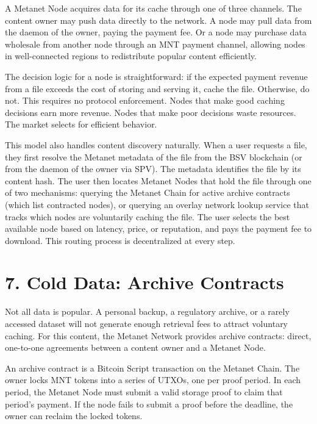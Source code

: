 \documentclass[11pt,a4paper]{article}
\begin{document}
A Metanet Node acquires data for its cache through one of three channels. The content owner may push data directly to the network. A node may pull data from the daemon of the owner, paying the payment fee. Or a node may purchase data wholesale from another node through an MNT payment channel, allowing nodes in well-connected regions to redistribute popular content efficiently.

The decision logic for a node is straightforward: if the expected payment revenue from a file exceeds the cost of storing and serving it, cache the file. Otherwise, do not. This requires no protocol enforcement. Nodes that make good caching decisions earn more revenue. Nodes that make poor decisions waste resources. The market selects for efficient behavior.

This model also handles content discovery naturally. When a user requests a file, they first resolve the Metanet metadata of the file from the BSV blockchain (or from the daemon of the owner via SPV). The metadata identifies the file by its content hash. The user then locates Metanet Nodes that hold the file through one of two mechanisms: querying the Metanet Chain for active archive contracts (which list contracted nodes), or querying an overlay network lookup service that tracks which nodes are voluntarily caching the file. The user selects the best available node based on latency, price, or reputation, and pays the payment fee to download. This routing process is decentralized at every step.

\section{7. Cold Data: Archive Contracts}

Not all data is popular. A personal backup, a regulatory archive, or a rarely accessed dataset will not generate enough retrieval fees to attract voluntary caching. For this content, the Metanet Network provides archive contracts: direct, one-to-one agreements between a content owner and a Metanet Node.

An archive contract is a Bitcoin Script transaction on the Metanet Chain. The owner locks MNT tokens into a series of UTXOs, one per proof period. In each period, the Metanet Node must submit a valid storage proof to claim that period's payment. If the node fails to submit a proof before the deadline, the owner can reclaim the locked tokens.
\end{document}
